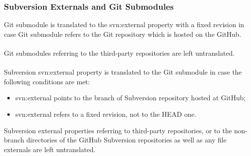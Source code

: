 \subsubsection{Subversion Externals and Git Submodules}
Git submodule is translated to the svn:external property with a fixed revision in case Git submodule refers to the Git repository
which is hosted on the GitHub.
\\\\
Git submodules referring to the third-party repositories are left untranslated.
\\\\
Subversion svn:external property is translated to the Git submodule in case the following conditions are met:
\begin{itemize}
\item svn:external points to the branch of Subversion repository hosted at GitHub;
\item svn:external refers to a fixed revision, not to the HEAD one.
\end{itemize}
Subversion external properties referring to third-party repositories, or to the non-branch directories of the GitHub Subversion repositories as
well as any file externals are left untranslated.